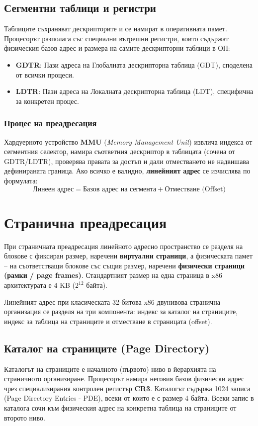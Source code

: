 \documentclass{scrartcl}
\begin{document}
\begin{FlushLeft}
\subsection{Сегментни таблици и регистри}
Таблиците съхраняват дескрипторите и се намират в оперативната памет. Процесорът разполага със специални вътрешни регистри, които съдържат физическия базов адрес и размера на самите дескрипторни таблици в ОП:
\begin{itemize}
    \item \textbf{GDTR}: Пази адреса на Глобалната дескрипторна таблица (GDT), споделена от всички процеси.
    \item \textbf{LDTR}: Пази адреса на Локалната дескрипторна таблица (LDT), специфична за конкретен процес.
\end{itemize}

\subsubsection{Процес на преадресация}
Хардуерното устройство \textbf{MMU} (\textit{Memory Management Unit}) извлича индекса от сегментния селектор, намира съответния дескриптор в таблицата (сочена от GDTR/LDTR), проверява правата за достъп и дали отместването не надвишава дефинираната граница. Ако всичко е валидно, \textbf{линейният адрес} се изчислява по формулата:
\[ \text{Линеен адрес} = \text{Базов адрес на сегмента} + \text{Отместване (Offset)} \]

\section{Странична преадресация}

При страничната преадресация линейното адресно пространство се разделя на блокове с фиксиран размер, наречени \textbf{виртуални страници}, а физическата памет – на съответстващи блокове със същия размер, наречени \textbf{физически страници (рамки / page frames)}. Стандартният размер на една страница в x86 архитектурата е 4 KB ($2^{12}$ байта).

Линейният адрес при класическата 32-битова x86 двунивова странична организация се разделя на три компонента: индекс за каталог на страниците, индекс за таблица на страниците и отместване в страницата (offset).

\subsection{Каталог на страниците (Page Directory)}
Каталогът на страниците е началното (първото) ниво в йерархията на страничното организиране. Процесорът намира неговия базов физически адрес чрез специализирания контролен регистър \textbf{CR3}. Каталогът съдържа 1024 записа (Page Directory Entries - PDE), всеки от които е с размер 4 байта. Всеки запис в каталога сочи към физическия адрес на конкретна таблица на страниците от второто ниво.


\end{FlushLeft}
\end{document}
